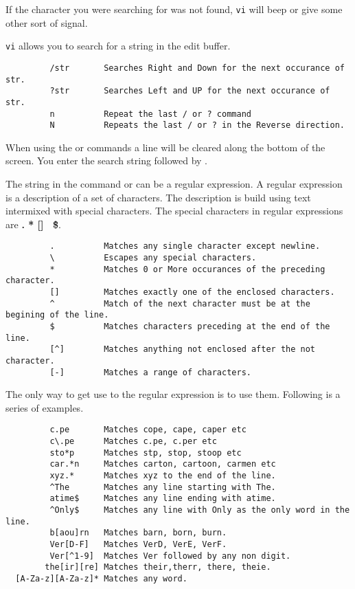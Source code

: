 If the character you were searching for was not found, {\tt vi} will
beep or give some other sort of signal.

{\tt vi} allows you to search for a string in the edit buffer.
\begin{verbatim}
         /str       Searches Right and Down for the next occurance of str.
         ?str       Searches Left and UP for the next occurance of str.
         n          Repeat the last / or ? command
         N          Repeats the last / or ? in the Reverse direction.
\end{verbatim}

 When using the \key{/} or  commands a line will be cleared along
the bottom of the screen. You enter the search string followed by .

The string in the command \key{/} or  can be a regular expression. A
regular expression is a description of a set of characters. The description
is build using text intermixed with special characters. The special
characters in regular expressions are {\bf . * [] \ \^ \$}.

\begin{verbatim}
         .          Matches any single character except newline.
         \          Escapes any special characters.
         *          Matches 0 or More occurances of the preceding character.
         []         Matches exactly one of the enclosed characters.
         ^          Match of the next character must be at the begining of the line.
         $          Matches characters preceding at the end of the line.
         [^]        Matches anything not enclosed after the not character.
         [-]        Matches a range of characters.
\end{verbatim}

        The only way to get use to the regular expression is to use them.
Following is a series of examples.

\begin{verbatim}
         c.pe       Matches cope, cape, caper etc
         c\.pe      Matches c.pe, c.per etc
         sto*p      Matches stp, stop, stoop etc
         car.*n     Matches carton, cartoon, carmen etc
         xyz.*      Matches xyz to the end of the line.
         ^The       Matches any line starting with The.
         atime$     Matches any line ending with atime.
         ^Only$     Matches any line with Only as the only word in the line.
         b[aou]rn   Matches barn, born, burn.
         Ver[D-F]   Matches VerD, VerE, VerF.
         Ver[^1-9]  Matches Ver followed by any non digit.
        the[ir][re] Matches their,therr, there, theie.
  [A-Za-z][A-Za-z]* Matches any word.
\end{verbatim}

